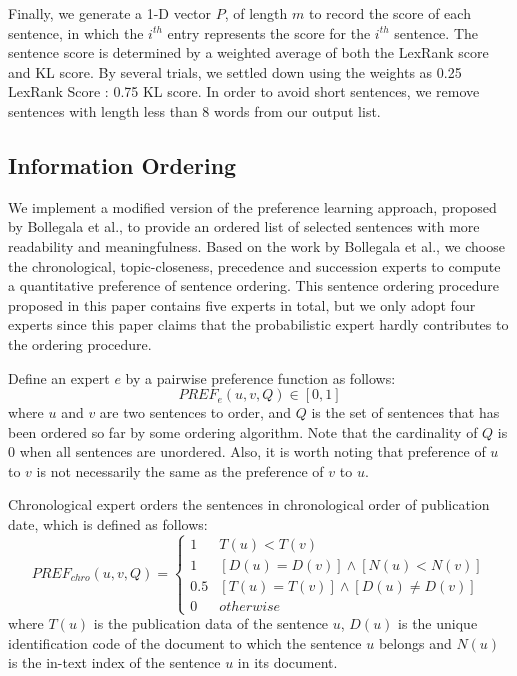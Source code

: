 \documentclass[11pt]{article}
\begin{document}
\indent
Finally, we generate a 1-D vector $P$,  of length $m$ to record the score of each sentence, in which the $i^{th}$ entry represents the score for the $i^{th}$ sentence. The sentence score is determined by a weighted average of both the LexRank score and KL score. By several trials, we settled down using the weights as 0.25 LexRank Score : 0.75 KL score. In order to avoid short sentences, we remove sentences with length less than 8 words from our output list. \\

\subsection{Information Ordering}

We implement a modified version of the preference learning approach, proposed by Bollegala et al., to provide an ordered list of selected sentences with more readability and meaningfulness. Based on the work by Bollegala et al., we choose the chronological, topic-closeness, precedence and succession experts to compute a quantitative preference of sentence ordering\cite{Bollegala:12}. This sentence ordering procedure proposed in this paper contains five experts in total, but we only adopt four experts since this paper claims that the probabilistic expert hardly contributes to the ordering procedure. 

\indent
Define an expert $e$ by a pairwise preference function as follows:
\begin{equation}
PREF_e(u,v,Q)\in[0,1]
\end{equation}
where $u$ and $v$ are two sentences to order, and $Q$ is the set of sentences that has been ordered so far by some ordering algorithm. Note that the cardinality of $Q$ is 0 when all sentences are unordered. Also, it is worth noting that preference of $u$ to $v$ is not necessarily the same as the preference of $v$ to $u$. 

\indent
Chronological expert orders the sentences in chronological order of publication date, which is defined as follows:
\tiny
\begin{equation}
PREF_{chro}(u,v,Q)=\begin{cases}
				1 & T(u) < T(v)\\
				1 & [D(u)=D(v)]\wedge[N(u)<N(v)]\\
				0.5 & [T(u)=T(v)]\wedge[D(u)\ne D(v)]\\
				0 & otherwise
				\end{cases}
\end{equation}
\normalsize
where $T(u)$ is the publication data of the sentence $u$, $D(u)$ is the unique identification code of the document to which the sentence $u$ belongs and $N(u)$ is the in-text index of the sentence $u$ in its document.
\end{document}
